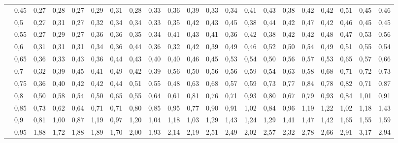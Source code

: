 \documentclass[a4paper,12pt]{article}
\theoremstyle{plain}
\begin{document}
\begin{landscape}
\begin{table}[H]
{\begin{tabular}{rl||ccccccccccccccccccc}
          & 0,45  & 0,27  & 0,28  & 0,27  & 0,29  & 0,31  & 0,28  & 0,33  & 0,36  & 0,39  & 0,33  & 0,34  & 0,41  & 0,43  & 0,38  & 0,42  & 0,42  & 0,51  & 0,45  & 0,46 \\
          & 0,5   & 0,27  & 0,31  & 0,27  & 0,32  & 0,34  & 0,34  & 0,33  & 0,35  & 0,42  & 0,43  & 0,45  & 0,38  & 0,44  & 0,42  & 0,47  & 0,42  & 0,46  & 0,45  & 0,45 \\
          & 0,55  & 0,27  & 0,29  & 0,27  & 0,36  & 0,36  & 0,35  & 0,34  & 0,41  & 0,43  & 0,41  & 0,36  & 0,42  & 0,38  & 0,42  & 0,42  & 0,48  & 0,47  & 0,53  & 0,56 \\
          & 0,6   & 0,31  & 0,31  & 0,31  & 0,34  & 0,36  & 0,44  & 0,36  & 0,32  & 0,42  & 0,39  & 0,49  & 0,46  & 0,52  & 0,50  & 0,54  & 0,49  & 0,51  & 0,55  & 0,54 \\
          & 0,65  & 0,36  & 0,33  & 0,43  & 0,36  & 0,44  & 0,43  & 0,40  & 0,40  & 0,46  & 0,45  & 0,53  & 0,54  & 0,50  & 0,56  & 0,57  & 0,53  & 0,65  & 0,57  & 0,66 \\
          & 0,7   & 0,32  & 0,39  & 0,45  & 0,41  & 0,49  & 0,42  & 0,39  & 0,56  & 0,50  & 0,56  & 0,56  & 0,59  & 0,54  & 0,63  & 0,58  & 0,68  & 0,71  & 0,72  & 0,73 \\
          & 0,75  & 0,36  & 0,40  & 0,42  & 0,42  & 0,44  & 0,51  & 0,55  & 0,48  & 0,63  & 0,68  & 0,57  & 0,59  & 0,73  & 0,77  & 0,84  & 0,78  & 0,82  & 0,71  & 0,87 \\
          & 0,8   & 0,50  & 0,58  & 0,54  & 0,50  & 0,65  & 0,55  & 0,64  & 0,61  & 0,81  & 0,76  & 0,71  & 0,93  & 0,80  & 0,67  & 0,79  & 0,93  & 0,84  & 1,01  & 0,91 \\
          & 0,85  & 0,73  & 0,62  & 0,64  & 0,71  & 0,71  & 0,80  & 0,85  & 0,95  & 0,77  & 0,90  & 0,91  & 1,02  & 0,84  & 0,96  & 1,19  & 1,22  & 1,02  & 1,18  & 1,43 \\
          & 0,9   & 0,81  & 1,00  & 0,87  & 1,19  & 0,97  & 1,20  & 1,04  & 1,18  & 1,03  & 1,29  & 1,43  & 1,24  & 1,29  & 1,41  & 1,47  & 1,42  & 1,65  & 1,55  & 1,59 \\
          & 0,95  & 1,88  & 1,72  & 1,88  & 1,89  & 1,70  & 2,00  & 1,93  & 2,14  & 2,19  & 2,51  & 2,49  & 2,02  & 2,57  & 2,32  & 2,78  & 2,66  & 2,91  & 3,17  & 2,94 \\
    \end{tabular}%
    }
  \label{tab:addlabel}%
\end{table}%
\end{landscape}
\end{document}
